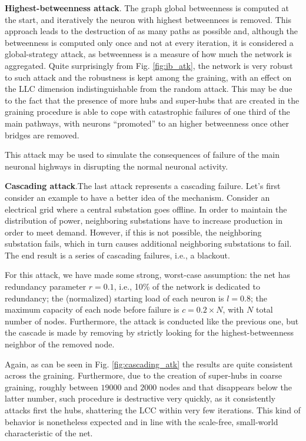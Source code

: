\vspace{\baselineskip}
\noindent \textbf{Highest-betweenness attack}. The graph global betweenness is computed at the start, and iteratively the neuron with highest betweennees is removed. This approach leads to the destruction of as many paths as possible and, although the betweenness is computed only once and not at every iteration, it is considered a global-strategy attack, as betweenness is a measure of how much the network is aggregated. Quite surprisingly from Fig. \ref{fig:ib_atk}, the network is very robust to such attack and the robustness is kept among the graining, with an effect on the LLC dimension indistinguishable from the random attack. This may be due to the fact that the presence of more hubs and super-hubs that are created in the graining procedure is able to cope with catastrophic failures of one third of the main pathways, with neurons ``promoted'' to an higher betweenness once other bridges are removed.

This attack may be used to simulate the consequences of failure of the main neuronal highways in disrupting the normal neuronal activity.
	
\vspace{\baselineskip}
\noindent \textbf{Cascading attack}.The last attack represents a cascading failure. Let's first consider an example to have a better idea of the mechanism. Consider an electrical grid where a central substation goes offline. In order to maintain the distribution of power, neighboring substations have to increase production in order to meet demand. However, if this is not possible, the neighboring substation fails, which in turn causes additional neighboring substations to fail. The end result is a series of cascading failures, i.e., a blackout.

For this attack, we have made some strong, worst-case assumption: the net has redundancy parameter $r = 0.1$, i.e., 10\% of the network is dedicated to redundancy; the (normalized) starting load of each neuron is $l=0.8$; the maximum capacity of each node before failure is $c = 0.2 \times N$, with $N$ total number of nodes. Furthermore, the attack is conducted like the previous one, but the cascade is made by removing by strictly looking for the highest-betweenness neighbor of the removed node.

Again, as can be seen in Fig. \ref{fig:cascading_atk} the results are quite consistent across the graining. Furthermore, due to the creation of super-hubs in coarse graining, roughly between $19000$ and $2000$ nodes and that disappears below the latter number, such procedure is destructive very quickly, as it consistently attacks first the hubs, shattering the LCC within very few iterations. This kind of behavior is nonetheless expected and in line with the scale-free, small-world characteristic of the net.

